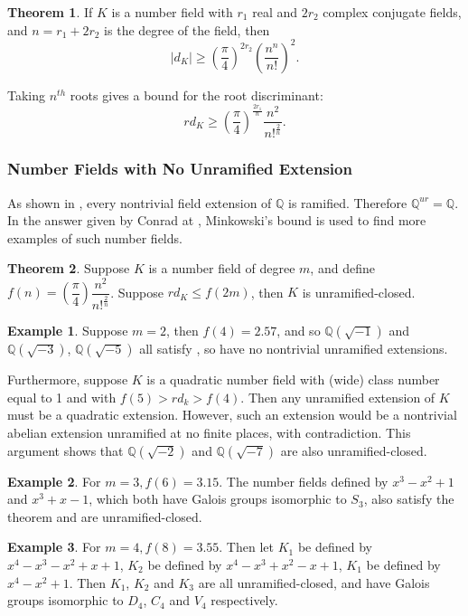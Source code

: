 \documentclass[12pt]{extarticle}
\newcommand{\Q}{\mathbb{Q}}
\newcommand{\<}{\langle}
\renewcommand{\>}{\rangle}
\theoremstyle{definition}
\newtheorem{theorem}{Theorem}
\newtheorem{example}{Example}
\begin{document}
\begin{theorem}
If $K$ is a number field with $r_1$ real and $2r_2$ complex conjugate fields, and $n=r_1+2r_2$ is the degree of the field, then 
\begin{equation}
|d_K| \geqslant \left( \dfrac{\pi}{4}\right)^{2r_2} \left( \dfrac{n^n}{n!}\right)^2.
\end{equation}
\end{theorem}





Taking $n^{th}$ roots gives a bound for the root discriminant:
\begin{equation}
rd_K\geqslant (\dfrac{\pi}{4})^{\frac{2r_1}{n}}\dfrac{n^2}{n!^{\frac{2}{n}}}.
\end{equation} 

\subsubsection*{Number Fields with No Unramified Extension}
As shown in , every nontrivial field extension of $\Q$ is ramified. Therefore $\Q^{ur} = \Q$. In the answer given by Conrad at \cite{CONRAD}, Minkowski's bound is used to find more examples of such number fields.
\begin{theorem}
Suppose $K$ is a number field of degree $m$, and define $f(n) = \left(\dfrac{\pi}{4}\right) \dfrac{n^2}{n!^{\frac{2}{n}}}$. Suppose $rd_K \leq f(2m)$, then $K$ is unramified-closed.
\label{thm:mink_bound}
\end{theorem}
\begin{example}
Suppose $m=2$, then $f(4) = 2.57$, and so $\Q(\sqrt{-1})$ and $\Q(\sqrt{-3})$, $\Q(\sqrt{-5})$ all satisfy , so have no nontrivial unramified extensions.  
\end{example}
Furthermore, suppose $K$ is a quadratic number field with (wide) class number equal to 1 and with $f(5) > rd_k > f(4)$. Then any unramified extension of $K$ must be a quadratic extension. However, such an extension would be a nontrivial abelian extension unramified at no finite places, with contradiction. This argument shows that $\Q(\sqrt{-2})$ and $\Q(\sqrt{-7})$ are also unramified-closed. 

\begin{example} 

For $m=3, f(6) = 3.15$. The number fields defined by $x^3-x^2+1$ and $x^3+x-1$, which both have Galois groups isomorphic to $S_3$, also satisfy the theorem and are unramified-closed.
\end{example}
\begin{example} 

For $m=4, f(8) = 3.55$. Then let $K_1$ be defined by $x^4 - x^3 - x^2 + x + 1$, $K_2$ be defined by $x^4 - x^3 + x^2 - x + 1$, $K_1$ be defined by $x^4 - x^2 + 1$. Then $K_1$, $K_2$ and $K_3$ are all unramified-closed, and have Galois groups isomorphic to $D_4$, $C_4$ and $V_4$ respectively. 
\end{example}
\end{document}
